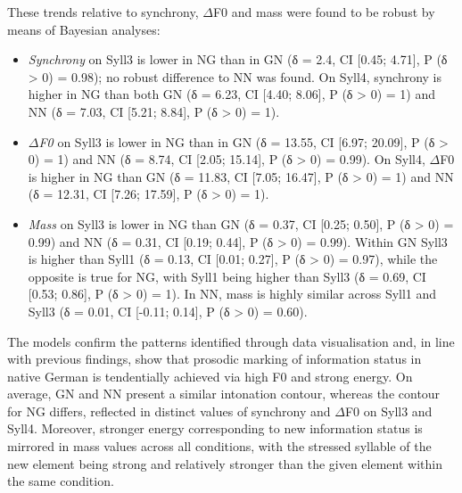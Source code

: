 These trends relative to synchrony, ${\Delta}$F0 and mass were found to be robust by means of Bayesian analyses:

\begin{itemize}
\item \textit{Synchrony} on Syll3 is lower in NG than in GN (δ = 2.4, CI [0.45; 4.71], P (δ > 0) = 0.98); no robust difference to NN was found. On Syll4, synchrony is higher in NG than both GN (δ = 6.23, CI [4.40; 8.06], P (δ > 0) = 1) and NN (δ = 7.03, CI [5.21; 8.84], P (δ > 0) = 1).
\item \textit{${\Delta}$F0} on Syll3 is lower in NG than in GN (δ = 13.55, CI [6.97; 20.09], P (δ > 0) = 1) and NN (δ = 8.74, CI [2.05; 15.14], P (δ > 0) = 0.99). On Syll4, ${\Delta}$F0 is higher in NG than GN (δ = 11.83, CI [7.05; 16.47], P (δ > 0) = 1) and NN (δ = 12.31, CI [7.26; 17.59], P (δ > 0) = 1).
\item \textit{Mass} on Syll3 is lower in NG than GN (δ = 0.37, CI [0.25; 0.50], P (δ > 0) = 0.99) and NN (δ = 0.31, CI [0.19; 0.44], P (δ > 0) = 0.99). Within GN Syll3 is higher than Syll1 (δ = 0.13, CI [0.01; 0.27], P (δ > 0) = 0.97), while the opposite is true for NG, with Syll1 being higher than Syll3 (δ = 0.69, CI [0.53; 0.86], P (δ > 0) = 1). In NN, mass is highly similar across Syll1 and Syll3 (δ = 0.01, CI [-0.11; 0.14], P (δ > 0) = 0.60).
\end{itemize}

The models confirm the patterns identified through data visualisation and, in line with previous findings, show that prosodic marking of information status in native German is tendentially achieved via high F0 and strong energy. On average, GN and NN present a similar intonation contour, whereas the contour for NG differs, reflected in distinct values of synchrony and ${\Delta}$F0 on Syll3 and Syll4. Moreover, stronger energy corresponding to new information status is mirrored in mass values across all conditions, with the stressed syllable of the new element being strong and relatively stronger than the given element within the same condition.

